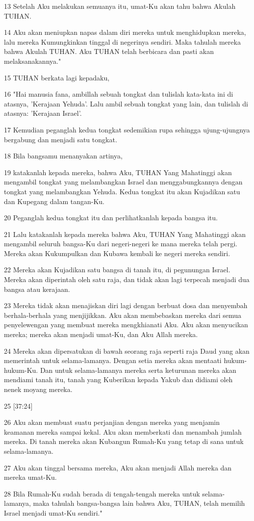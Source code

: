 \par 13 Setelah Aku melakukan semuanya itu, umat-Ku akan tahu bahwa Akulah TUHAN.
\par 14 Aku akan meniupkan napas dalam diri mereka untuk menghidupkan mereka, lalu mereka Kumungkinkan tinggal di negerinya sendiri. Maka tahulah mereka bahwa Akulah TUHAN. Aku TUHAN telah berbicara dan pasti akan melaksanakannya."
\par 15 TUHAN berkata lagi kepadaku,
\par 16 "Hai manusia fana, ambillah sebuah tongkat dan tulislah kata-kata ini di atasnya, 'Kerajaan Yehuda'. Lalu ambil sebuah tongkat yang lain, dan tulislah di atasnya: 'Kerajaan Israel'.
\par 17 Kemudian peganglah kedua tongkat sedemikian rupa sehingga ujung-ujungnya bergabung dan menjadi satu tongkat.
\par 18 Bila bangsamu menanyakan artinya,
\par 19 katakanlah kepada mereka, bahwa Aku, TUHAN Yang Mahatinggi akan mengambil tongkat yang melambangkan Israel dan menggabungkannya dengan tongkat yang melambangkan Yehuda. Kedua tongkat itu akan Kujadikan satu dan Kupegang dalam tangan-Ku.
\par 20 Peganglah kedua tongkat itu dan perlihatkanlah kepada bangsa itu.
\par 21 Lalu katakanlah kepada mereka bahwa Aku, TUHAN Yang Mahatinggi akan mengambil seluruh bangsa-Ku dari negeri-negeri ke mana mereka telah pergi. Mereka akan Kukumpulkan dan Kubawa kembali ke negeri mereka sendiri.
\par 22 Mereka akan Kujadikan satu bangsa di tanah itu, di pegunungan Israel. Mereka akan diperintah oleh satu raja, dan tidak akan lagi terpecah menjadi dua bangsa atau kerajaan.
\par 23 Mereka tidak akan menajiskan diri lagi dengan berbuat dosa dan menyembah berhala-berhala yang menjijikkan. Aku akan membebaskan mereka dari semua penyelewengan yang membuat mereka mengkhianati Aku. Aku akan menyucikan mereka; mereka akan menjadi umat-Ku, dan Aku Allah mereka.
\par 24 Mereka akan dipersatukan di bawah seorang raja seperti raja Daud yang akan memerintah untuk selama-lamanya. Dengan setia mereka akan mentaati hukum-hukum-Ku. Dan untuk selama-lamanya mereka serta keturunan mereka akan mendiami tanah itu, tanah yang Kuberikan kepada Yakub dan didiami oleh nenek moyang mereka.
\par 25 [37:24]
\par 26 Aku akan membuat suatu perjanjian dengan mereka yang menjamin keamanan mereka sampai kekal. Aku akan memberkati dan menambah jumlah mereka. Di tanah mereka akan Kubangun Rumah-Ku yang tetap di sana untuk selama-lamanya.
\par 27 Aku akan tinggal bersama mereka, Aku akan menjadi Allah mereka dan mereka umat-Ku.
\par 28 Bila Rumah-Ku sudah berada di tengah-tengah mereka untuk selama-lamanya, maka tahulah bangsa-bangsa lain bahwa Aku, TUHAN, telah memilih Israel menjadi umat-Ku sendiri."

